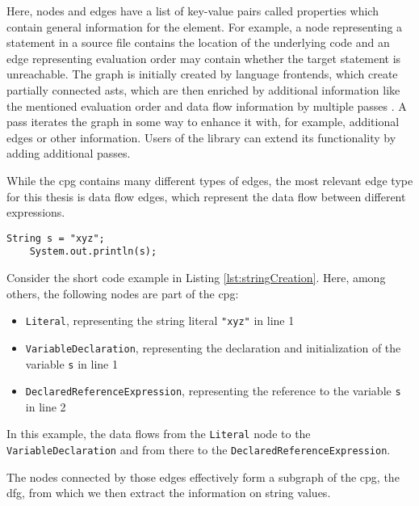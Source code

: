 Here, nodes and edges have a list of key-value pairs called properties which contain general information for the element. For example, a node representing a statement in a source file contains the location of the underlying code and an edge representing evaluation order may contain whether the target statement is unreachable. The graph is initially created by language frontends, which create partially connected \acp{ast}, which are then enriched by additional information like the mentioned evaluation order and data flow information by multiple passes \cite{cpg}. A pass iterates the graph in some way to enhance it with, for example, additional edges or other information.
Users of the library can extend its functionality by adding additional passes.

While the \ac{cpg} contains many different types of edges, the most relevant edge type for this thesis is data flow edges, which represent the data flow between different expressions.

\begin{lstlisting}[label={lst:stringCreation}, caption={\ac{cpg} example code}, captionpos=b, numbers=right]
	String s = "xyz";
	System.out.println(s);
\end{lstlisting}

Consider the short code example in Listing \ref{lst:stringCreation}. Here, among others, the following nodes are part of the \ac{cpg}:

\begin{itemize}
	\item \lstinline|Literal|, representing the string literal \lstinline{"xyz"} in line 1
	\item \lstinline|VariableDeclaration|, representing the declaration and initialization of the variable \lstinline|s| in line 1
	\item \lstinline|DeclaredReferenceExpression|, representing the reference to the variable \lstinline|s| in line 2
\end{itemize}

In this example, the data flows from the \lstinline|Literal| node to the \lstinline|VariableDeclaration| and from there to the \lstinline|DeclaredReferenceExpression|.

The nodes connected by those edges effectively form a subgraph of the \ac{cpg}, the \ac{dfg}, from which we then extract the information on string values.



